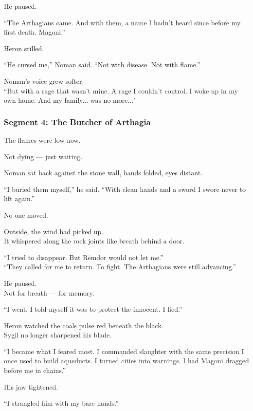\documentclass[9pt]{article}
\begin{document}
He paused.

“The Arthagians came. And with them, a name I hadn’t heard since before my first death. Magoni.”

Heron stilled.

“He cursed me,” Noman said. “Not with disease. Not with flame.”

Noman’s voice grew softer.\\
“But with a rage that wasn’t mine. A rage I couldn’t control. I woke up in my own home. And my family... was no more..."
\newpage

\subsubsection*{Segment 4: The Butcher of Arthagia}

The flames were low now.

Not dying — just waiting.

Noman sat back against the stone wall, hands folded, eyes distant.

“I buried them myself,” he said. “With clean hands and a sword I swore never to lift again.”

No one moved.

Outside, the wind had picked up.\\
It whispered along the rock joints like breath behind a door.

“I tried to disappear. But Rēmdor would not let me.”\\
“They called for me to return. To fight. The Arthagians were still advancing.”

He paused.\\
Not for breath — for memory.

“I went. I told myself it was to protect the innocent. I lied.”

\vspace{1em}

Heron watched the coals pulse red beneath the black.\\
Sygil no longer sharpened his blade.

“I became what I feared most. I commanded slaughter with the same precision I once used to build aqueducts. I turned cities into warnings. I had Magoni dragged before me in chains.”

His jaw tightened.

“I strangled him with my bare hands.”

\vspace{1em}
\end{document}
